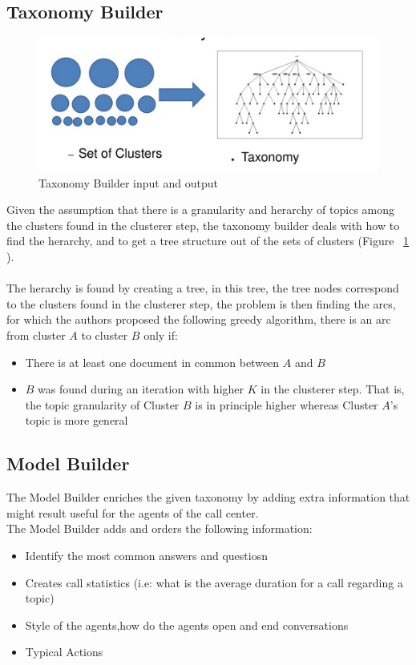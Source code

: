 \documentclass[4pt,a4paper,twocolumn]{article}
\begin{document}
\subsection{Taxonomy Builder}

\begin{figure}[]
  \centering
    \includegraphics[scale=0.2]{pics/taxonomyBuilder.jpg}
    \caption{Taxonomy Builder input and output}
   \label{fig:taxonomyBuilder}  
\end{figure}

Given the assumption that there is a granularity and herarchy of topics among the clusters found in the clusterer step, the taxonomy builder deals with  how to find the herarchy, and to get a tree structure out of the sets of clusters (Figure ~\ref{fig:taxonomyBuilder} ).\\
\\
The herarchy is found by creating a tree, in this tree, the tree nodes correspond to the clusters found in the clusterer step, the problem is then finding the arcs, for which the authors proposed the following greedy algorithm, there is an arc from cluster $A$ to cluster $B$ only if:
\begin{itemize}
	\item  There is at least one document in common between $A$ and $B$
	\item  $B$ was found during an iteration with higher $K$ in the clusterer step. That is, the topic granularity of Cluster $B$ is in principle higher whereas Cluster $A$'s topic is more general
\end{itemize}


\subsection{Model Builder}
The Model Builder enriches the given taxonomy by adding extra information that might result useful for the 
agents of the call center.\\
The Model Builder adds and orders the following information:
\begin{itemize}
	\item Identify the most common answers and questiosn
	\item Creates call statistics (i.e: what is the average duration for a call regarding a topic)
	\item Style of the agents,how do the agents open and end conversations
	\item Typical Actions
\end{itemize}
\end{document}
